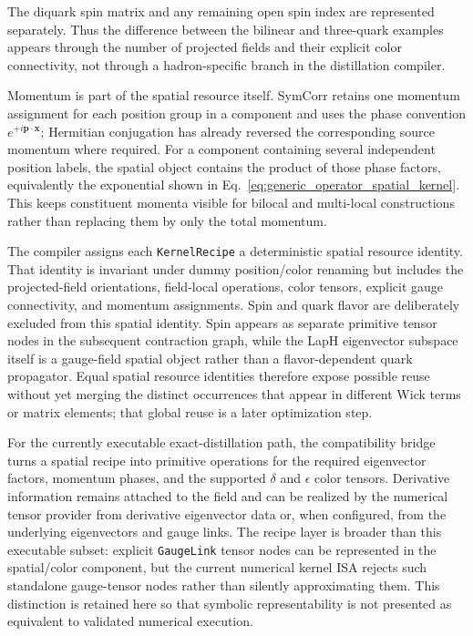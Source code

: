 \documentclass[11pt]{article}
\begin{document}
The diquark spin matrix and any remaining open spin index are represented
separately. Thus the difference between the bilinear and three-quark examples
appears through the number of projected fields and their explicit color
connectivity, not through a hadron-specific branch in the distillation
compiler.

Momentum is part of the spatial resource itself. SymCorr retains one momentum
assignment for each position group in a component and uses the phase convention
\(e^{+i\mathbf p\cdot\mathbf x}\); Hermitian conjugation has already reversed
the corresponding source momentum where required. For a component containing
several independent position labels, the spatial object contains the product of
those phase factors, equivalently the exponential shown in
Eq.~\eqref{eq:generic_operator_spatial_kernel}. This keeps constituent momenta
visible for bilocal and multi-local constructions rather than replacing them by
only the total momentum.

The compiler assigns each \texttt{KernelRecipe} a deterministic spatial
resource identity. That identity is invariant under dummy position/color
renaming but includes the projected-field orientations, field-local operations,
color tensors, explicit gauge connectivity, and momentum assignments. Spin and
quark flavor are deliberately excluded from this spatial identity. Spin appears
as separate primitive tensor nodes in the subsequent contraction graph, while
the LapH eigenvector subspace itself is a gauge-field spatial object rather
than a flavor-dependent quark propagator. Equal spatial resource identities
therefore expose possible reuse without yet merging the distinct occurrences
that appear in different Wick terms or matrix elements; that global reuse is a
later optimization step.

For the currently executable exact-distillation path, the compatibility bridge
turns a spatial recipe into primitive operations for the required eigenvector
factors, momentum phases, and the supported \(\delta\) and \(\epsilon\) color
tensors. Derivative information remains attached to the field and can be
realized by the numerical tensor provider from derivative eigenvector data or,
when configured, from the underlying eigenvectors and gauge links. The recipe
layer is broader than this executable subset: explicit \texttt{GaugeLink}
tensor nodes can be represented in the spatial/color component, but the current
numerical kernel ISA rejects such standalone gauge-tensor nodes rather than
silently approximating them. This distinction is retained here so that symbolic
representability is not presented as equivalent to validated numerical
execution.
\end{document}
